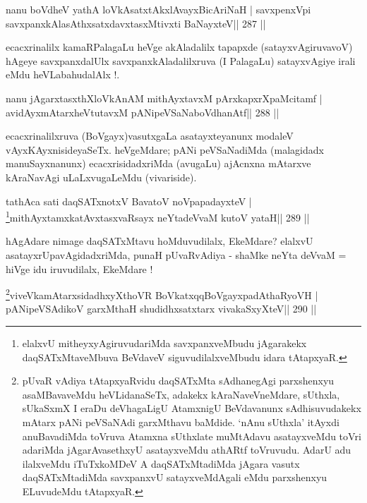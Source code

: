 
\begin{shl}
nanu boVdheV yathA loVkAsatxtAkxlAvayxBicAriNaH |
savxpenxV\s pi savxpanxkAlasAthxsatxdavxtasxMtivxti BaNayxteV\hfill || 287 ||
\end{shl}

\begin{artha}
ecacxrinalilx kamaRPalagaLu heVge akAladalilx tapapxde (satayxvAgiruvavoV) hAgeye savxpanxdalUlx savxpanxkAladalilxruva (I PalagaLu) satayxvAgiye irali eMdu heVLabahudalAlx !.
\end{artha}


\begin{shl}
nanu jAgarxtasxthXloVkAnAM mithAyxtavxM pArxkapxrXpaMcitamf |
avidAyxmAtarxheVtutavxM pANipeVSaNaboVdhanAtf\hfill || 288 ||
\end{shl}

\begin{artha}
ecacxrinalilxruva (BoVgayx)vasutxgaLa asatayxteyanunx modaleV  vAyxKAyxnisideyaSeTx. heVgeMdare; pANi peVSaNadiMda (malagidadx  manuSayxnanunx) ecacxrisidadxriMda (avugaLu) ajAcnxna mAtarxve kAraNavAgi uLaLxvugaLeMdu (vivariside).
\end{artha}


\begin{shl}
tathAca sati daqSATxnotxV BavatoV noVpapadayxteV |
\footnote{elalxvU mitheyxyAgiruvudariMda savxpanxveMbudu jAgarakekx daqSATxMtaveMbuva BeVdaveV siguvudilalxveMbudu idara tAtapxyaR.}mithAyxtamxkatAvxtasxvaRsayx neYtadeVvaM kutoV yataH\hfill || 289 ||
\end{shl}

\begin{artha}
hAgAdare nimage daqSATxMtavu hoMduvudilalx, EkeMdare? elalxvU asatayxrUpavAgidadxriMda, punaH pUvaRvAdiya - shaMke  \mdash  neYta deVvaM = hiVge idu iruvudilalx, EkeMdare !
\end{artha}


\begin{shl}
\footnote{pUvaR vAdiya tAtapxyaRvidu  \mdash  daqSATxMta sAdhanegAgi parxshenxyu asaMBavaveMdu heVLidanaSeTx, adakekx kAraNaveVneMdare, sUthxla, sUkaSxmX I eraDu deVhagaLigU AtamxnigU BeVdavanunx sAdhisuvudakekx mAtarx pANi peVSaNAdi garxMthavu baMdide. `nAnu sUthxla' itAyxdi anuBavadiMda toVruva Atamxna sUthxlate muMtAdavu asatayxveMdu toVri adariMda jAgarAvasethxyU asatayxveMdu athARtf toVruvudu. AdarU adu ilalxveMdu iTuTxkoMDeV A daqSATxMtadiMda jAgara vasutx daqSATxMtadiMda savxpanxvU satayxveMdAgali eMdu parxshenxyu ELuvudeMdu tAtapxyaR.}viveVkamAtarxsidadhxyXthoVR BoVkatxqqBoVgayxpadAthaRyoVH |
pANipeVSAdikoV garxMthaH shudidhxsatxtarx vivakaSxyXteV\hfill || 290 ||
\end{shl}

